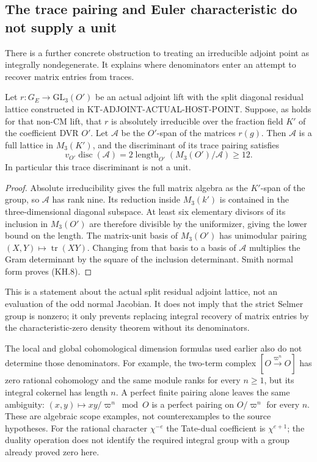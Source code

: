 \subsection{The trace pairing and Euler characteristic do not supply a unit}

There is a further concrete obstruction to treating an
irreducible adjoint point as integrally nondegenerate.  It
explains where denominators enter an attempt to recover matrix
entries from traces.

\begin{lemma}
Let $r:G_E\to\mathrm{GL}_3(O')$ be an actual adjoint lift with
the split diagonal residual lattice constructed in
KT-ADJOINT-ACTUAL-HOST-POINT.  Suppose, as holds for that
non-CM lift, that $r$ is absolutely irreducible over the fraction
field $K'$ of the coefficient DVR $O'$.  Let $\mathcal A$ be
the $O'$-span of the matrices $r(g)$.  Then $\mathcal A$ is a
full lattice in $M_3(K')$, and the discriminant of its trace
pairing satisfies
\[
 v_{O'}\operatorname{disc}(\mathcal A)
       =2\operatorname{length}_{O'}(M_3(O')/\mathcal A)
       \geq12.                                             \tag{KH.8}
\]
In particular this trace discriminant is not a unit.
\end{lemma}
\begin{proof}
Absolute irreducibility gives the full matrix algebra as the
$K'$-span of the group, so $\mathcal A$ has rank nine.  Its
reduction inside $M_3(k')$ is contained in the three-dimensional
diagonal subspace.  At least six elementary divisors of its
inclusion in $M_3(O')$ are therefore divisible by the uniformizer,
giving the lower bound on the length.  The matrix-unit basis of
$M_3(O')$ has unimodular pairing $(X,Y)\mapsto\operatorname{tr}(XY)$.
Changing from that basis to a basis of $\mathcal A$ multiplies
the Gram determinant by the square of the inclusion determinant.
Smith normal form proves (KH.8).
\end{proof}

This is a statement about the actual split residual adjoint
lattice, not an evaluation of the odd normal Jacobian.  It
does not imply that the strict Selmer group is nonzero; it
only prevents replacing integral recovery of matrix entries by
the characteristic-zero density theorem without its denominators.

The local and global cohomological dimension formulas used
earlier also do not determine those denominators.  For example,
the two-term complex
$[O\xrightarrow{\varpi^n}O]$ has zero rational cohomology and
the same module ranks for every $n\geq1$, but its integral
cokernel has length $n$.  A perfect finite pairing alone leaves
the same ambiguity: $(x,y)\mapsto xy/\varpi^n\bmod O$ is a
perfect pairing on $O/\varpi^n$ for every $n$.  These are algebraic
scope examples, not counterexamples to the source hypotheses.
For the rational character $\chi^{-e}$ the Tate-dual coefficient
is $\chi^{e+1}$; the duality operation does not identify the
required integral group with a group already proved zero here.

